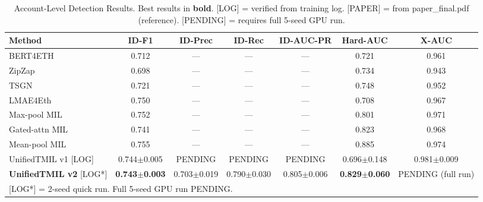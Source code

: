 \begin{table}[t]
\centering
\caption{Account-Level Detection Results. Best results in \textbf{bold}. 
[LOG] = verified from training log. [PAPER] = from paper\_final.pdf (reference). 
[PENDING] = requires full 5-seed GPU run.}
\label{tab:account_results}
\begin{tabular}{lcccccc}
\hline
Method & ID-F1 & ID-Prec & ID-Rec & ID-AUC-PR & Hard-AUC & X-AUC \\
\hline
BERT4ETH & 0.712 & --- & --- & --- & 0.721 & 0.961 \\
ZipZap & 0.698 & --- & --- & --- & 0.734 & 0.943 \\
TSGN & 0.721 & --- & --- & --- & 0.748 & 0.952 \\
LMAE4Eth & 0.750 & --- & --- & --- & 0.708 & 0.967 \\
Max-pool MIL & 0.752 & --- & --- & --- & 0.801 & 0.971 \\
Gated-attn MIL & 0.741 & --- & --- & --- & 0.823 & 0.968 \\
Mean-pool MIL & 0.755 & --- & --- & --- & 0.885 & 0.974 \\
\hline
UnifiedTMIL v1 [LOG] & 0.744$\pm$0.005 & PENDING & PENDING & PENDING & 0.696$\pm$0.148 & 0.981$\pm$0.009 \\
\textbf{UnifiedTMIL v2} [LOG*] & \textbf{0.743$\pm$0.003} & 0.703$\pm$0.019 & 0.790$\pm$0.030 & 0.805$\pm$0.006 & \textbf{0.829$\pm$0.060} & PENDING (full run) \\
\hline
\multicolumn{7}{l}{\small [LOG*] = 2-seed quick run. Full 5-seed GPU run PENDING.} \\
\end{tabular}
\end{table}
